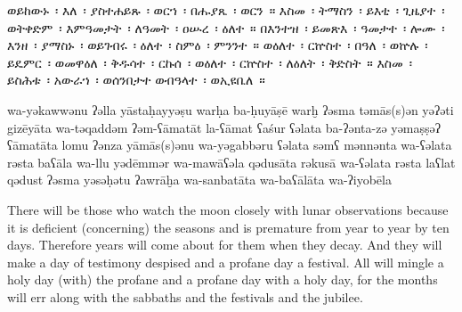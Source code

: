 
\begin{ethiopictext}
    ወይከውኑ~፡ እለ~፡ ያስተሐይጹ~፡ ወርኀ~፡
    በሑያጼ~፡ ወርን~። እስመ~፡ ትማስን~፡ ይእቲ~፡ ጊዜያተ~፡ ወትቀድም~፡
    እምዓመታት~፡ ለዓመት~፡ ዐሡረ~፡ ዕለተ~።
    በእንተዝ~፡ ይመጽእ~፡
    ዓመታተ~፡ ሎሙ~፡ እንዘ~፡ ያማስኑ~፡ ወይገብሩ~፡ ዕለተ~፡ ስምዕ~፡
    ምንንተ~። ወዕለተ~፡ ርኵስተ~፡ በዓለ~፡ ወኵሉ~፡ ይዴምር~፡ ወመዋዕለ~፡ 
    ቅዱሳተ~፡ ርኩሰ~፡ ወዕለተ~፡ ርኵስተ~፡ ለዕለት~፡ ቅድስት~። እስመ~፡
    ይስሕቱ~፡ አውራኀ~፡ ወሰንበታተ ወብዓላተ~፡ ወኢዩቤለ~።
\end{ethiopictext}
\begin{transliteration}
    wa-yəkawwənu ʔəlla yāstaḥayyəṣu warḥa 
    ba-ḥuyāṣē warḫ ʔəsma təmās(s)ən yəʔəti gizēyāta wa-təqaddəm 
    ʔəm-ʕāmatāt la-ʕāmat ʕaśur ʕəlata
    ba-ʔənta-zə yəmaṣṣəʔ 
    ʕāmatāta lomu ʔənza yāmās(s)ənu wa-yəgabbəru ʕəlata səmʕ 
    mənnənta wa-ʕəlata rəsta baʕāla wa-llu yədēmmər wa-mawāʕəla 
    qədusāta rəkusā wa-ʕəlata rəsta laʕlat qədust ʔəsma
    yəsəḥətu ʔawrāḫa wa-sanbatāta wa-baʕālāta wa-ʔiyobēla
\end{transliteration}
\begin{translation}
    There will be those who watch the moon closely with lunar observations
    because it is deficient (concerning) the seasons and is premature from year to year by ten days. 
    Therefore
    years will come about for them when they decay. And they will make a day of
    testimony despised and a profane day a festival. All will mingle a holy day
    (with) the profane and a profane day with a holy day, for
    the months will err along with the sabbaths and the festivals and the jubilee.
\end{translation}